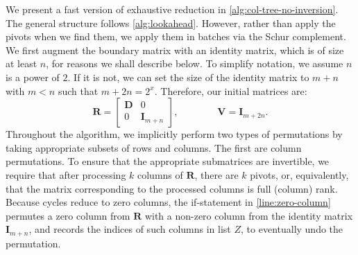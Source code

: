 \documentclass[10pt,a4paper]{article}
\newcommand{\mat}[1]{\mathbf{#1}}
\newcommand{\bdr}{\mat{D}}
\begin{document}
\begin{algorithm}[h]

\end{algorithm}



We present a fast version of exhaustive reduction in \cref{alg:col-tree-no-inversion}.
The general structure follows \cref{alg:lookahead}. However, rather than apply
the pivots when we find them, we apply them in batches via the Schur complement.
%
%
We first augment the boundary matrix with an identity matrix, which is of size at least $n$, for reasons we shall describe below. To simplify notation, we assume $n$ is a power of $2$. If it is not, we can set the size of the identity matrix to $m+n$ with $m<n$ such that $m+2n = 2^x$. Therefore, our initial matrices are:
\[\mat{R} = \begin{bmatrix} \bdr & 0  \\ 0 & \mat{I}_{m+n} \end{bmatrix}, \qquad\qquad \mat{V} = \mat{I}_{m+2n}.\]
Throughout the algorithm, we implicitly perform two types of permutations by
taking appropriate subsets of rows and columns.
The first are column permutations.  To ensure that the appropriate submatrices are invertible, we require
that after processing $k$ columns of $\mat{R}$, there are $k$ pivots, or, equivalently,
that the matrix corresponding to the processed columns is full (column) rank.
Because cycles reduce to zero columns, the if-statement in
\cref{line:zero-column} permutes a zero column from $\mat{R}$
with a non-zero column from the identity matrix $\mat{I}_{m+n}$, and records the
indices of such columns in list $Z$, to eventually undo the permutation.
\end{document}
